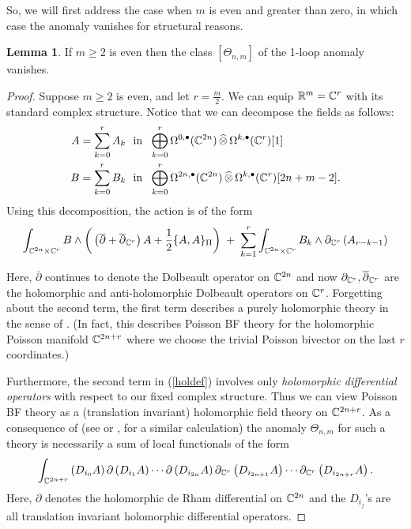\documentclass[11pt, oneside, reqno]{amsart}
\theoremstyle{definition} \newtheorem{definition}{Definition}[section]
\newtheorem{lemma}[definition]{Lemma}
\theoremstyle{definition}
\theoremstyle{remark}
\theoremstyle{definition} \newtheorem{remark}[definition]{Remark}
\theoremstyle{definition} \newtheorem{remarks}[definition]{Remarks}
\theoremstyle{definition} \newtheorem{question}[definition]{Question}
\theoremstyle{definition} \newtheorem*{note}{Note}
\theoremstyle{definition} \newtheorem{example}[definition]{Example}
\theoremstyle{definition} \newtheorem{examples}[definition]{Examples}
\def\bu{\bullet}
\def\Hat{\widehat}
\newcommand{\dbar}{\overline{\partial}}
\begin{document}
So, we will first address the case when $m$ is even and greater than zero, in which case the anomaly vanishes for structural reasons.

\begin{lemma} \label{even_m_lemma}
If $m \ge 2$ is even then the class $[\Theta_{n,m}]$ of the 1-loop anomaly vanishes.
\end{lemma}

\begin{proof}
Suppose $m \ge 2$ is even, and let $r = \frac m2$. We can equip $\mathbb R^m = \mathbb C^{r}$ with its standard complex structure.
Notice that we can decompose the fields as follows:
\begin{align*}
A  = \sum_{k=0}^r A_k & \ \text{ in }\  \bigoplus_{k=0}^r \Omega^{0,\bu} (\CC^{2n}) \, \Hat{\otimes} \, \Omega^{k, \bu} (\CC^{r}) [1] \\
B = \sum_{k=0}^r B_k & \ \text{ in }\  \bigoplus_{k=0}^r \Omega^{2n,\bu} (\CC^{2n}) \, \Hat{\otimes} \, \Omega^{k, \bu} (\CC^{r}) [2n+m-2] .
\end{align*}
Using this decomposition, the action is of the form
\begin{equation}\label{holdef}
\int_{\CC^{2n} \times \CC^{r}} B \wedge \bigg( \left(\dbar + \dbar_{\CC^{r}}\right) A + \frac12 \{A , A\}_\Pi \bigg) \; + \; \sum_{k =1}^{{r}} \int_{\CC^{2n} \times \CC^{r}} B_k \wedge \partial_{\CC^{r}} \left(A_{r - k - 1} \right)
\end{equation}

Here, $\dbar$ continues to denote the Dolbeault operator on $\mathbb C^{2n}$ and now $\partial_{\CC^{r}}, \dbar_{\CC^{r}}$ are the holomorphic and anti-holomorphic Dolbeault operators on $\mathbb C^{r}$. 
Forgetting about the second term, the first term describes a purely holomorphic theory in the sense of \cite{BWhol}. 
(In fact, this describes Poisson BF theory for the holomorphic Poisson manifold $\mathbb C^{2n+{r}}$ where we choose the trivial Poisson bivector on the last ${r}$ coordinates.)

Furthermore, the second term in (\ref{holdef}) involves only {\em holomorphic differential operators} with respect to our fixed complex structure. 
Thus we can view Poisson BF theory as a (translation invariant) holomorphic field theory on $\mathbb C^{2n + r}$. As a consequence of \cite[Proposition 4.4]{BWhol} (see \cite[Lemma 7.2.7]{BCOV1} or \cite[Lemma B.1]{GwilliamWilliamsKM}, for a similar calculation) the anomaly $\Theta_{n,m}$ for such a theory is necessarily a sum of local functionals of the form
\begin{equation}\label{holanomaly}
\int_{\mathbb C^{2n+r}} \left(D_{i_0} A\right) \partial \left(D_{i_1} A\right) \cdots \partial \left(D_{i_{2n}} A \right) \partial_{\mathbb C^{r}} \left(D_{i_{2n+1}} A\right) \cdots \partial_{\mathbb C^{r}} \left(D_{i_{2n+r}} A\right) .
\end{equation}
Here, $\partial$ denotes the holomorphic de Rham differential on $\mathbb C^{2n}$ and the $D_{i_j}$'s are all translation invariant holomorphic differential operators. 


\end{proof}
\end{document}
